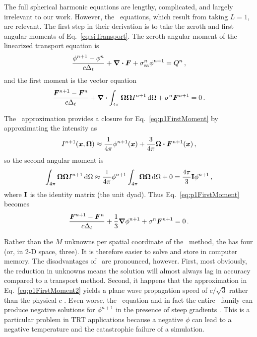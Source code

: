 The full spherical harmonic equations \cite{McC2007} are lengthy, complicated, and
largely irrelevant to our work. However, the \Pone\ equations, which result from
taking $L=1$, are relevant. The first step in their derivation is to take the
zeroth and first angular moments of Eq.~\eqref{eq:siTransport}. The zeroth
angular moment of the linearized transport equation is
\begin{equation}\label{eq:p1ZerothMoment}
  \frac{\phi^{n+1} - \phi^n }{c \Delta_t}
  + \bm{\nabla} \bm{\cdot} \bm{F}
  + \sigma_\mathrm{ea}^n \phi^{n+1}
  = Q^n\,,
\end{equation}
and the first moment is the vector equation
\begin{equation}\label{eq:p1FirstMoment}
  \frac{\bm{F}^{n+1} - \bm{F}^n }{c \Delta_t} + \bm{\nabla} \bm{\cdot} \int_{4\pi}
  \bm{\Omega}\bm{\Omega} I^{n+1} \mathop{}\!\mathrm{d}\Omega
  + \sigma^n \bm{F}^{n+1}
  = 0\,.
\end{equation}

The \Pone\ approximation provides a closure for Eq.~\eqref{eq:p1FirstMoment} by
approximating the intensity as
\begin{equation}\label{eq:p1Approx}
  I^{n+1}(\bm{x},\bm{\Omega})
  \approx \frac{1}{4\pi} \phi^{n+1}(\bm{x})
  + \frac{3}{4\pi} \bm{\Omega}\bm{\cdot} \bm{F}^{n+1}(\bm{x}) \,,
\end{equation}
so the second angular moment is
\begin{equation*}
  \int_{4\pi} \bm{\Omega}\bm{\Omega} I^{n+1} \mathop{}\!\mathrm{d}\Omega
  \approx \frac{1}{4\pi} \phi^{n+1}
  \int_{4\pi} \bm{\Omega}\bm{\Omega}\mathop{}\!\mathrm{d}\Omega + 0
  = \frac{4\pi}{3} \mathbf{I} \phi^{n+1}\,,
\end{equation*}
where $\mathbf{I}$ is the identity matrix (the unit dyad). Thus
Eq.~\eqref{eq:p1FirstMoment} becomes
\begin{equation} \label{eq:p1FirstMoment2}
  \frac{\bm{F}^{n+1} - \bm{F}^n }{c \Delta_t} + \frac{1}{3} \bm{\nabla} \phi^{n+1}
  + \sigma^n \bm{F}^{n+1}
  = 0\,.
\end{equation}

Rather than the $M$ unknowns per spatial coordinate of the \SN\ method, the
\Pone has four (or, in 2-D space, three). It is therefore easier to solve and
store in computer memory. The disadvantages of \Pone\ are pronounced, however.
First, most obviously, the reduction in unknowns means the solution will almost
always lag in accuracy compared to a transport method. Second, it happens that
the approximation in Eq.~\eqref{eq:p1FirstMoment2} yields a plane wave
propagation speed of $c/\sqrt{3}$ rather than the physical $c$
\cite{Mih1984,War2002}. Even worse, the \Pone\ equation and in fact the entire
\PN\ family can produce negative solutions for $\phi^{n+1}$ in the presence of
steep gradients \cite{Bru2002,McC2007}. This is a particular problem in TRT
applications because a negative $\phi$ can lead to a negative temperature and
the catastrophic failure of a simulation.


